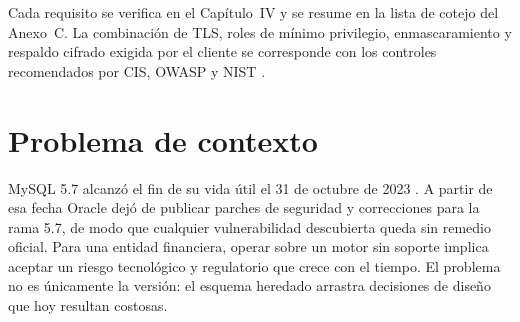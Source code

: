 \begin{table}[H]
  \centering
  \caption{Requisitos no funcionales del cliente}
  \label{tab:requisitos-no-funcionales}
\end{table}

Cada requisito se verifica en el Capítulo~IV y se resume en la lista de
cotejo del Anexo~C. La combinación de TLS, roles de mínimo privilegio,
enmascaramiento y respaldo cifrado exigida por el cliente se corresponde con
los controles recomendados por CIS, OWASP y NIST
\citep{cis2024postgres,owasp2023asvs,nist80053}.

\section{Problema de contexto}

MySQL 5.7 alcanzó el fin de su vida útil el 31 de octubre de 2023
\citep{oracle2023mysql57}. A partir de esa fecha Oracle dejó de publicar
parches de seguridad y correcciones para la rama 5.7, de modo que cualquier
vulnerabilidad descubierta queda sin remedio oficial. Para una entidad
financiera, operar sobre un motor sin soporte implica aceptar un riesgo
tecnológico y regulatorio que crece con el tiempo. El problema no es
únicamente la versión: el esquema heredado arrastra decisiones de diseño que
hoy resultan costosas.

